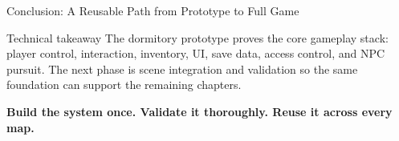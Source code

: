 \documentclass[aspectratio=169,10pt]{beamer}
\begin{document}
\begin{frame}{Conclusion: A Reusable Path from Prototype to Full Game}
  \begin{block}{Technical takeaway}
    The dormitory prototype proves the core gameplay stack: player control, interaction, inventory, UI, save data, access control, and NPC pursuit. The next phase is scene integration and validation so the same foundation can support the remaining chapters.
  \end{block}

  \vfill
  \begin{center}
    \Large\textcolor{GameGreen}{\textbf{Build the system once. Validate it thoroughly. Reuse it across every map.}}
  \end{center}
\end{frame}
\end{document}
